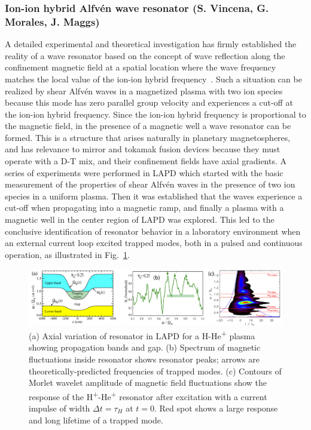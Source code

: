 \documentclass[11pt]{article}
\renewcommand{\cite}{\citep}
\begin{document}
\subsubsection{Ion-ion hybrid Alfvén wave resonator (S. Vincena, G. Morales, J.
Maggs)}

A detailed experimental and theoretical investigation has firmly
established the reality of a wave resonator based on the concept of
wave reflection along the confinement magnetic field at a spatial
location where the wave frequency matches the local value of the
ion-ion hybrid
frequency~\cite{vincena:2010,vincena:2011,farmer:2012,vincena:2013,farmer:2013}. Such
a situation can be realized by shear Alfvén waves in a magnetized
plasma with two ion species because this mode has zero parallel group
velocity and experiences a cut-off at the ion-ion hybrid
frequency. Since the ion-ion hybrid frequency is proportional to the
magnetic field, in the presence of a magnetic well a wave resonator
can be formed. This is a structure that arises naturally in planetary
magnetospheres, and has relevance to mirror and tokamak fusion devices
because they must operate with a D-T mix, and their confinement fields
have axial gradients. A series of experiments were performed in LAPD
which started with the basic measurement of the properties of shear
Alfvén waves in the presence of two ion species in a uniform plasma.
Then it was established that the waves experience a cut-off when
propagating into a magnetic ramp, and finally a plasma with a magnetic
well in the center region of LAPD was explored. This led to the
conclusive identification of resonator behavior in a laboratory
environment when an external current loop excited trapped modes, both
in a pulsed and continuous operation, as illustrated in Fig.~\ref{twoion}.


\begin{figure}[!htbp]
\centerline{\includegraphics[width=6.2truein]{twoion}}
\caption{(a) Axial variation of resonator in LAPD for a
H-He\textsuperscript{+} plasma showing propagation bands and gap. (b)
Spectrum of magnetic fluctuations inside resonator shows resonator
peaks; arrows are theoretically-predicted frequencies of trapped
modes. (c) Contours of Morlet wavelet amplitude of magnetic field
fluctuations show the response of the
H\textsuperscript{+}-He\textsuperscript{+} resonator after excitation
with a current impulse of width $\Delta t = \tau_H$ at
$t = 0$. Red spot shows a large response and long lifetime of a
trapped mode.}\label{twoion}
\end{figure}
\end{document}
